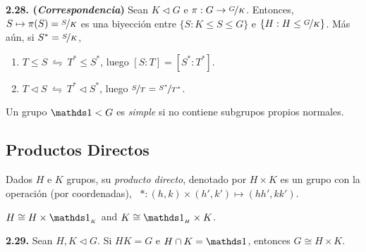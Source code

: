 \hypertarget{thm228}{}
\begin{theorem}
    \textbf{2.28. (\emph{Correspondencia})} Sean \(K \lhd G\) e \(\pi : G \to \nicefrac{G}{K}\). Entonces, \(S \mapsto \pi(S) = \nicefrac{S}{K}\) es una biyección entre \(\{S: K \leq S \leq G\}\) e \(\{H : H \leq \nicefrac{G}{K}\}\). Más aún, si \(S^* = \nicefrac{S}{K}\), 
    \begin{enumerate}[label = \roman*., left = 0.35cm]
        \item \vspace{-0.2cm}\(T \leq S \ \leftrightharpoons \ T^* \leq S^*\), luego \([S:T] = [S^*: T^*]\). 
        \item \(T \lhd S \ \leftrightharpoons \ T^* \lhd S^*\), luego \(\nicefrac{S}{T}= \nicefrac{S^*}{T^*}\). 
    \end{enumerate}
\end{theorem}

\vspace{-0.2cm}

\begin{definition}
    Un grupo \(\id < G\) es \emph{simple} si no contiene subgrupos propios normales.  
\end{definition}

\subsection*{Productos Directos}

\begin{definition}
    Dados \(H\) e \( K \) grupos, su \emph{producto directo}, denotado por \(H \times K\) es un grupo con la operación (por coordenadas), \ \(*: (h,k) \times (h',k') \mapsto (h h', k k')\). 
\end{definition}

\begin{note}
    \(H \cong H \times \id_{_K}\) and \(K \cong \id_{_H} \times K\). 
\end{note}

\hypertarget{thm229}{}
\begin{theorem}
    \textbf{2.29.} Sean \(H, K \lhd G\). Si \(HK = G \) e \(H \cap K = \id\), entonces \(G \cong H \times K\).  
\end{theorem}



